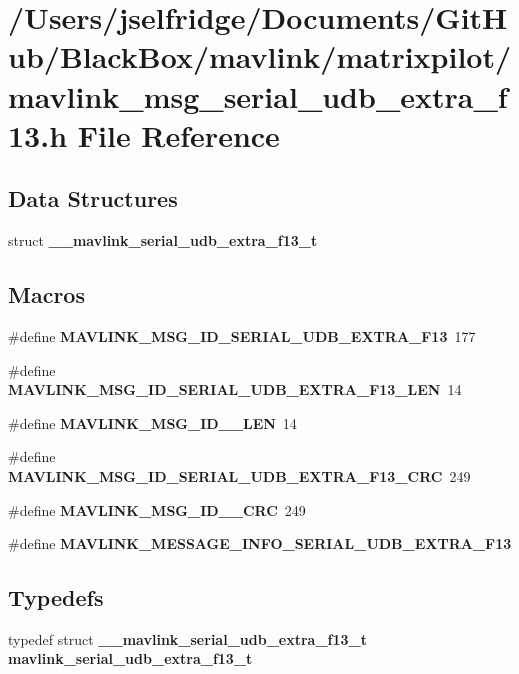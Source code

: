 \section{/\+Users/jselfridge/\+Documents/\+Git\+Hub/\+Black\+Box/mavlink/matrixpilot/mavlink\+\_\+msg\+\_\+serial\+\_\+udb\+\_\+extra\+\_\+f13.h File Reference}
\label{mavlink__msg__serial__udb__extra__f13_8h}
\subsection*{Data Structures}
\begin{DoxyCompactItemize}
\item 
struct \textbf{ \+\_\+\+\_\+mavlink\+\_\+serial\+\_\+udb\+\_\+extra\+\_\+f13\+\_\+t}
\end{DoxyCompactItemize}
\subsection*{Macros}
\begin{DoxyCompactItemize}
\item 
\#define \textbf{ M\+A\+V\+L\+I\+N\+K\+\_\+\+M\+S\+G\+\_\+\+I\+D\+\_\+\+S\+E\+R\+I\+A\+L\+\_\+\+U\+D\+B\+\_\+\+E\+X\+T\+R\+A\+\_\+\+F13}~177
\item 
\#define \textbf{ M\+A\+V\+L\+I\+N\+K\+\_\+\+M\+S\+G\+\_\+\+I\+D\+\_\+\+S\+E\+R\+I\+A\+L\+\_\+\+U\+D\+B\+\_\+\+E\+X\+T\+R\+A\+\_\+\+F13\+\_\+\+L\+EN}~14
\item 
\#define \textbf{ M\+A\+V\+L\+I\+N\+K\+\_\+\+M\+S\+G\+\_\+\+I\+D\+\_\+\_\+\+L\+EN}~14
\item 
\#define \textbf{ M\+A\+V\+L\+I\+N\+K\+\_\+\+M\+S\+G\+\_\+\+I\+D\+\_\+\+S\+E\+R\+I\+A\+L\+\_\+\+U\+D\+B\+\_\+\+E\+X\+T\+R\+A\+\_\+\+F13\+\_\+\+C\+RC}~249
\item 
\#define \textbf{ M\+A\+V\+L\+I\+N\+K\+\_\+\+M\+S\+G\+\_\+\+I\+D\+\_\+\_\+\+C\+RC}~249
\item 
\#define \textbf{ M\+A\+V\+L\+I\+N\+K\+\_\+\+M\+E\+S\+S\+A\+G\+E\+\_\+\+I\+N\+F\+O\+\_\+\+S\+E\+R\+I\+A\+L\+\_\+\+U\+D\+B\+\_\+\+E\+X\+T\+R\+A\+\_\+\+F13}
\end{DoxyCompactItemize}
\subsection*{Typedefs}
\begin{DoxyCompactItemize}
\item 
typedef struct \textbf{ \+\_\+\+\_\+mavlink\+\_\+serial\+\_\+udb\+\_\+extra\+\_\+f13\+\_\+t} \textbf{ mavlink\+\_\+serial\+\_\+udb\+\_\+extra\+\_\+f13\+\_\+t}
\end{DoxyCompactItemize}


